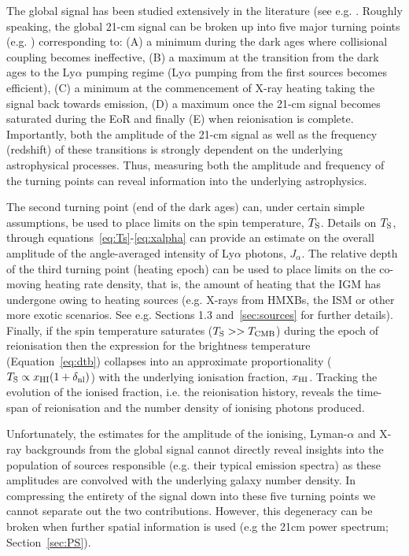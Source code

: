 The global signal has been studied extensively in the literature (see e.g. \cite{Furlanetto:2006c,Pritchard:2010a,Pritchard:2012,Mirocha:2013,Fialkov:2014b,Mirocha:2014,Mirocha:2015,Mirocha:2017,Cohen:2017,Fialkov:2018,Mirocha:2018,Fialkov:2019b}. Roughly speaking, the global 21-cm signal can be broken up into five major turning points (e.g. \cite{Furlanetto:2006b,Pritchard:2010a}) corresponding to: (A) a minimum during the dark ages where collisional coupling becomes ineffective, (B) a maximum at the transition from the dark ages to the Ly$\alpha$ pumping regime (Ly$\alpha$ pumping from the first sources becomes efficient), (C) a minimum at the commencement of X-ray heating taking the signal back towards emission, (D) a maximum once the 21-cm signal becomes saturated during the EoR and finally (E) when reionisation is complete. Importantly, both the amplitude of the 21-cm signal as well as the frequency (redshift) of these transitions is strongly dependent on the underlying astrophysical processes. Thus, measuring both the amplitude and frequency of the turning points can reveal information into the underlying astrophysics.

The second turning point (end of the dark ages) can, under certain simple assumptions, be used to place limits on the spin temperature, $T_{\rm S}$. Details on $T_{\rm S}$, through equations~\ref{eq:Ts}-\ref{eq:xalpha} can provide an estimate on the overall amplitude of the angle-averaged intensity of Ly$\alpha$ photons, $J_{\alpha}$. 
The relative depth of the third turning point (heating epoch) can be used to place limits on the co-moving heating rate density, that is, the amount of heating that the IGM has undergone owing to heating sources (e.g. X-rays from HMXBs, the ISM or other more exotic scenarios. See e.g. Sections 1.3 and~\ref{sec:sources} for further details). Finally, if the spin temperature saturates ($T_{\rm S} >> T_{\rm CMB}$) during the epoch of reionisation then the expression for the brightness temperature (Equation~\ref{eq:dtb}) collapses into an approximate proportionality ($T_{\rm S} \propto x_{\rm H{\scriptstyle I}}(1+\delta_{\rm nl})$) with the underlying ionisation fraction, $x_{\rm H{\scriptstyle I}}$. Tracking the evolution of the ionised fraction, i.e. the reionisation history, reveals the time-span of reionisation and the number density of ionising photons produced. 

Unfortunately, the estimates for the amplitude of the ionising, Lyman-$\alpha$ and X-ray backgrounds from the global signal cannot directly reveal insights into the population of sources responsible (e.g. their typical emission spectra) as these amplitudes are convolved with the underlying galaxy number density. In compressing the entirety of the signal down into these five turning points we cannot separate out the two contributions. However, this degeneracy can be broken when further spatial information is used (e.g the 21cm power spectrum; Section~\ref{sec:PS}).

